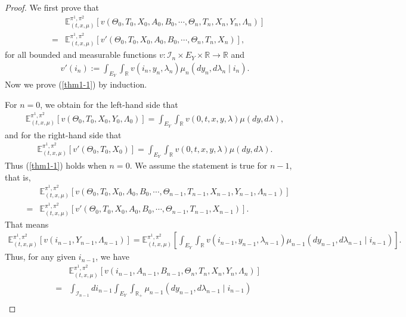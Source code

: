 \documentclass[12pt]{article}
\begin{document}
\begin{proof}
We first prove that
\begin{eqnarray} \label{thm1-1}
&&\mathbb{E}^{\pi^1,\pi^2}_{(t,x,\mu)}[v(\Theta_0,T_0,X_0,A_0,B_0,\cdots,\Theta_n,T_n,X_n,Y_n,\Lambda_n)]\nonumber\\
&=&\mathbb{E}^{\pi^1,\pi^2}_{(t,x,\mu)}[v'(\Theta_0,T_0,X_0,A_0,B_0,\cdots,\Theta_n,T_n,X_n)],
\end{eqnarray}
for all bounded and measurable functions $v:\mathscr{I}_n\times E_Y\times \mathbb{R}\to\mathbb{R}$ and
\begin{eqnarray*}
v'(i_n):=\int_{E_Y}\int_{\mathbb{R}}v(i_n,y_n,\lambda_n)\mu_n(dy_n,d\lambda_n\mid i_n).
\end{eqnarray*}
Now we prove (\ref{thm1-1}) by induction.

For $n=0$, we obtain for the left-hand side that
\begin{eqnarray*}
\mathbb{E}^{\pi^1,\pi^2}_{(t,x,\mu)}[v(\Theta_0,T_0,X_0,Y_0,\Lambda_0)]=\int_{E_Y}\int_{\mathbb{R}}v(0,t,x,y,\lambda)\mu(dy,d\lambda),
\end{eqnarray*}
and for the right-hand side that
\begin{eqnarray*}
\mathbb{E}^{\pi^1,\pi^2}_{(t,x,\mu)}[v'(\Theta_0,T_0,X_0)]=\int_{E_Y}\int_{\mathbb{R}}v(0,t,x,y,\lambda)\mu(dy,d\lambda).
\end{eqnarray*}
Thus (\ref{thm1-1}) holds when $n=0$.
We assume the statement is true for $n-1$, that is,
\begin{eqnarray*}
&&\mathbb{E}^{\pi^1,\pi^2}_{(t,x,\mu)}[v(\Theta_0,T_0,X_0,A_0,B_0,\cdots,\Theta_{n-1},T_{n-1},X_{n-1},Y_{n-1},\Lambda_{n-1})]\\
&=&\mathbb{E}^{\pi^1,\pi^2}_{(t,x,\mu)}[v'(\Theta_0,T_0,X_0,A_0,B_0,\cdots,\Theta_{n-1},T_{n-1},X_{n-1})].
\end{eqnarray*}
That means
\begin{eqnarray*}
\mathbb{E}^{\pi^1,\pi^2}_{(t,x,\mu)}[v(i_{n-1},Y_{n-1},\Lambda_{n-1})]
=\mathbb{E}^{\pi^1,\pi^2}_{(t,x,\mu)}[\int_{E_Y}\int_{\mathbb{R}}v(i_{n-1},y_{n-1},\lambda_{n-1})\mu_{n-1}(dy_{n-1},d\lambda_{n-1}\mid i_{n-1})].
\end{eqnarray*}
Thus, for any given $i_{n-1}$, we have
\begin{eqnarray*}
&&\mathbb{E}^{\pi^1,\pi^2}_{(t,x,\mu)}[v(i_{n-1},A_{n-1},B_{n-1},\Theta_n,T_n,X_n,Y_n,\Lambda_n)]\\
&=&\int_{\mathscr{I}_{n-1}}di_{n-1}\int_{E_Y}\int_{\mathbb{R}_+}
\mu_{n-1}(dy_{n-1},d\lambda_{n-1}\mid i_{n-1})\\

\end{eqnarray*}
\end{proof}
\end{document}
